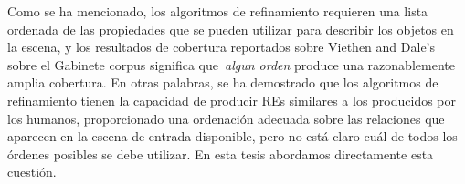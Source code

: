 Como se ha mencionado, los algoritmos de refinamiento requieren una
lista ordenada de las propiedades que se pueden utilizar para describir los objetos en la escena, y los resultados de cobertura reportados sobre Viethen and 
Dale's sobre el 
Gabinete corpus significa que~\emph{algun orden} produce una razonablemente amplia cobertura. En otras palabras, se ha demostrado que los algoritmos de refinamiento tienen la capacidad de producir REs similares a los producidos por los humanos, proporcionado una ordenaci\'on adecuada sobre las relaciones que aparecen
en la escena de entrada disponible, pero no est\'a claro cu\'al de todos los \'ordenes posibles se debe utilizar. En esta tesis abordamos directamente esta cuesti\'on.



